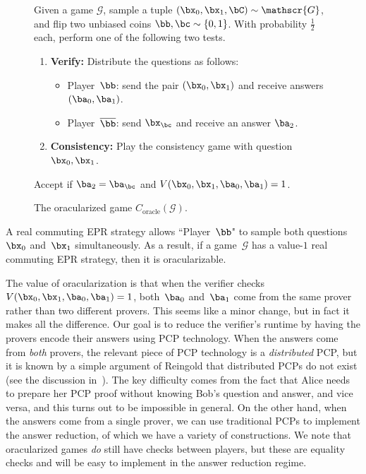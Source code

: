 \documentclass[11pt]{article}
\newcommand{\game}{\mathscr{G}}
\begin{document}
{
  \begin{figure}
    Given a game $\game$, sample a tuple $(\bx_0, \bx_1, \bC) \sim
    \game$, and flip two unbiased coins $\bb, \bc \sim \{0,1\}$.
    With probability $\tfrac{1}{2}$ each, perform one of the following two tests. 
    \begin{enumerate}
      \item \textbf{Verify:} Distribute the questions as follows:
      	\begin{itemize}
	\item[$\circ$] Player~$\bb$: send the pair $(\bx_0, \bx_1)$ and receive answers $(\ba_0, \ba_1)$.
	\item[$\circ$] Player~$\overline{\bb}$: send $\bx_{\bc}$ and receive an answer $\ba_2$.
	\end{itemize}
	\item \textbf{Consistency:} Play the consistency game with question $\bx_0, \bx_1$.
    \end{enumerate}
    Accept if $\ba_2 = \ba_{\bc}$ and $V(\bx_0, \bx_1, \ba_0, \ba_1) = 1$.
    \caption{The oracularized game $C_{\mathrm{oracle}}(\game)$.\label{fig:oracle}}
  \end{figure}
  }
  
\noindent
A real commuting EPR strategy allows ``Player~$\bb$" to sample both questions~$\bx_0$ and~$\bx_1$ simultaneously.
As a result, if a game~$\game$ has a value-$1$ real commuting EPR strategy, then it is oracularizable.

The value of oracularization is that when the verifier checks $V(\bx_0, \bx_1, \ba_0, \ba_1) = 1$,
both~$\ba_0$ and~$\ba_1$ come from the same prover rather than two different provers.
This seems like a minor change, but in fact it makes all the difference.
Our goal is to reduce the verifier's runtime by having the provers encode their answers using PCP technology.
When the answers come from \emph{both} provers,
the relevant piece of PCP technology is a \emph{distributed} PCP,
but it is known by a simple argument of Reingold that distributed PCPs do not exist
(see the discussion in~\cite{ARW17}).
The key difficulty comes from the fact that Alice needs to prepare her PCP proof without
knowing Bob's question and answer, and vice versa, and this turns out to be impossible in general.
On the other hand,
when the answers come from a single prover,
we can use traditional PCPs to implement the answer reduction, of which we have a variety of constructions.
We note that oracularized games \emph{do} still have checks between players,
but these are equality checks and will be easy to implement in the answer reduction regime.
\end{document}
